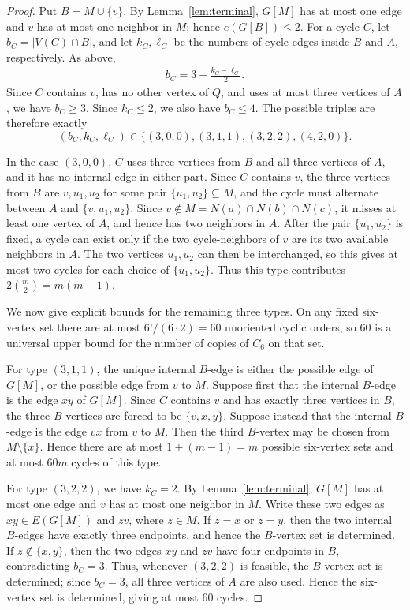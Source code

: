 \documentclass[11pt,letterpaper]{article}
\begin{document}
\begin{proof}
Put \(B=M\cup\{v\}\). By Lemma~\ref{lem:terminal}, \(G[M]\) has at most one edge and \(v\) has
at most one neighbor in \(M\); hence \(e(G[B])\le2\). For a cycle \(C\), let
\(b_C=|V(C)\cap B|\), and let \(k_C,\ell_C\) be the numbers of cycle-edges inside \(B\) and \(A\),
respectively. As above,
\begin{align}\label{eq:bc-value}
    b_C=3+\frac{k_C-\ell_C}{2}.
\end{align}
Since \(C\) contains \(v\), has no other vertex of \(Q\), and uses at most three vertices of \(A\),
we have \(b_C\ge3\). Since \(k_C\le2\), we also have \(b_C\le4\). The possible triples are therefore
exactly
\[
  (b_C,k_C,\ell_C)\in
  \{(3,0,0),(3,1,1),(3,2,2),(4,2,0)\}.
\]

In the case \((3,0,0)\), $C$ uses three vertices from \(B\) and all three vertices of \(A\), and it has no internal edge in either
part. Since $C$ contains \(v\), the three vertices from \(B\) are \(v,u_1,u_2\) for some
pair \(\{u_1,u_2\}\subseteq M\), and the cycle must alternate between \(A\) and
\(\{v,u_1,u_2\}\). Since \(v\notin M=N(a)\cap N(b)\cap N(c)\), it misses at least one vertex of
\(A\), and hence has two neighbors in \(A\). After the pair \(\{u_1,u_2\}\) is fixed, a
cycle can exist only if the two cycle-neighbors of \(v\) are its two available neighbors in \(A\).
The two vertices \(u_1,u_2\) can then be interchanged, so this gives at most two cycles for each
choice of \(\{u_1,u_2\}\). Thus this type contributes $2\binom m2=m(m-1)$.


We now give explicit bounds for the remaining three types. On any fixed six-vertex set there are at
most \(6!/(6\cdot 2)=60\) unoriented cyclic orders, so 60 is a universal upper bound for the number of copies of
\(C_6\) on that set.

For type \((3,1,1)\), the unique internal \(B\)-edge is either the possible edge of \(G[M]\), or the
possible edge from \(v\) to \(M\). Suppose first that the internal \(B\)-edge is the edge \(xy\) of
\(G[M]\). Since \(C\) contains \(v\) and has exactly three vertices in \(B\), the three \(B\)-vertices
are forced to be \(\{v,x,y\}\).
Suppose instead that the internal \(B\)-edge is the edge \(vx\) from \(v\) to \(M\). Then the third
\(B\)-vertex may be chosen from \(M\setminus\{x\}\). Hence there are
at most \(1+(m-1)=m\) possible six-vertex sets and at most \(60m\) cycles of this type.

For type \((3,2,2)\), we have \(k_C=2\). By Lemma~\ref{lem:terminal}, \(G[M]\) has at most one edge
and \(v\) has at most one neighbor in \(M\). %
Write these two edges as \(xy\in E(G[M])\) and \(zv\), where \(z\in M\). If
\(z=x\) or \(z=y\), then the two internal \(B\)-edges have exactly three endpoints, and hence the
\(B\)-vertex set is determined. If \(z\notin\{x,y\}\), then the two edges \(xy\) and \(zv\) have four
endpoints in \(B\), contradicting \(b_C=3\). Thus, whenever $(3,2,2)$ is feasible, the \(B\)-vertex set
is determined; since \(b_C=3\), all three vertices of \(A\) are also used. Hence the six-vertex set is
determined, giving at most \(60\) cycles.


\end{proof}
\end{document}
